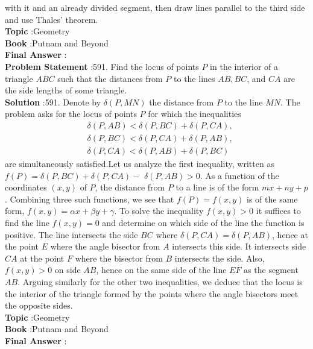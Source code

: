\documentclass[10pt]{article}
\begin{document}
with it and an already divided segment, then draw lines parallel to the third side and use Thales' theorem.\\
\textbf{Topic} :Geometry\\
\textbf{Book} :Putnam and Beyond\\
\textbf{Final Answer} :\\


\textbf{Problem Statement} :591. Find the locus of points $P$ in the interior of a triangle $A B C$ such that the distances from $P$ to the lines $A B, B C$, and $C A$ are the side lengths of some triangle.\\
\textbf{Solution} :591. Denote by $\delta(P, M N)$ the distance from $P$ to the line $M N$. The problem asks for the locus of points $P$ for which the inequalities$$ \begin{aligned} &\delta(P, A B)<\delta(P, B C)+\delta(P, C A), \\ &\delta(P, B C)<\delta(P, C A)+\delta(P, A B), \\ &\delta(P, C A)<\delta(P, A B)+\delta(P, B C) \end{aligned} $$are simultaneously satisfied.Let us analyze the first inequality, written as $f(P)=\delta(P, B C)+\delta(P, C A)-$ $\delta(P, A B)>0$. As a function of the coordinates $(x, y)$ of $P$, the distance from $P$ to a line is of the form $m x+n y+p$. Combining three such functions, we see that $f(P)=f(x, y)$ is of the same form, $f(x, y)=\alpha x+\beta y+\gamma$. To solve the inequality $f(x, y)>0$ it suffices to find the line $f(x, y)=0$ and determine on which side of the line the function is positive. The line intersects the side $B C$ where $\delta(P, C A)=\delta(P, A B)$, hence at the point $E$ where the angle bisector from $A$ intersects this side. It intersects side $C A$ at the point $F$ where the bisector from $B$ intersects the side. Also, $f(x, y)>0$ on side $A B$, hence on the same side of the line $E F$ as the segment $A B$. Arguing similarly for the other two inequalities, we deduce that the locus is the interior of the triangle formed by the points where the angle bisectors meet the opposite sides.\\
\textbf{Topic} :Geometry\\
\textbf{Book} :Putnam and Beyond\\
\textbf{Final Answer} :\\
\end{document}
